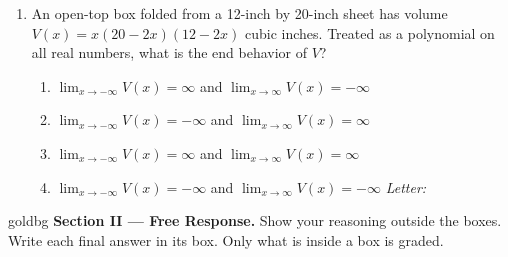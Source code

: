 \documentclass[10pt]{article}
\begin{document}
\begin{enumerate}[leftmargin=1.9em, itemsep=10pt]
\item An open-top box folded from a 12-inch by 20-inch sheet has volume $V(x) = x(20 - 2x)(12 - 2x)$
      cubic inches. Treated as a polynomial on all real numbers, what is the end behavior of $V$?
      \begin{enumerate}[leftmargin=2.6em, itemsep=1pt]
        \item[(A)] $\lim_{x \to -\infty} V(x) = \infty$ and $\lim_{x \to \infty} V(x) = -\infty$
        \item[{\color{keyred}$\checkmark$\,(B)}] $\lim_{x \to -\infty} V(x) = -\infty$ and $\lim_{x \to \infty} V(x) = \infty$
        \item[(C)] $\lim_{x \to -\infty} V(x) = \infty$ and $\lim_{x \to \infty} V(x) = \infty$
        \item[(D)] $\lim_{x \to -\infty} V(x) = -\infty$ and $\lim_{x \to \infty} V(x) = -\infty$
        \hfill\textit{Letter:}~\gradedblank[id=ap5, type=choice, points=1, answer=B]{0.42in}{13pt}
      \end{enumerate}

\end{enumerate}

\newpage

\begin{headlinebox}{goldbg}
\small
\textbf{Section II --- Free Response.} Show your reasoning outside the boxes. Write each final
answer in its box. Only what is inside a box is graded.
\end{headlinebox}

\vspace{0.06in}
\end{document}
